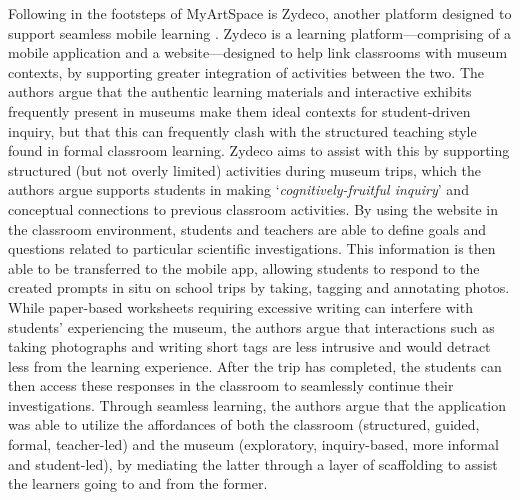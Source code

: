 Following in the footsteps of MyArtSpace is Zydeco, another platform designed to support seamless mobile learning \citep{cahill2010, kuhn2011}. Zydeco is a learning platform---comprising of a mobile application and a website---designed to help link classrooms with museum contexts, by supporting greater integration of activities between the two. The authors argue that the authentic learning materials and interactive exhibits frequently present in museums make them ideal contexts for student-driven inquiry, but that this can frequently clash with the structured teaching style found in formal classroom learning. Zydeco aims to assist with this by supporting structured (but not overly limited) activities during museum trips, which the authors argue supports students in making `\textit{cognitively-fruitful inquiry}' and conceptual connections to previous classroom activities. By using the website in the classroom environment, students and teachers are able to define goals and questions related to particular scientific investigations. This information is then able to be transferred to the mobile app, allowing students to respond to the created prompts in situ on school trips by taking, tagging and annotating photos. While paper-based worksheets requiring excessive writing can interfere with students' experiencing the museum, the authors argue that interactions such as taking photographs and writing short tags are less intrusive and would detract less from the learning experience. After the trip has completed, the students can then access these responses in the classroom to seamlessly continue their investigations. Through seamless learning, the authors argue that the application was able to utilize the affordances of both the classroom (structured, guided, formal, teacher-led) and the museum (exploratory, inquiry-based, more informal and student-led), by mediating the latter through a layer of scaffolding to assist the learners going to and from the former.

